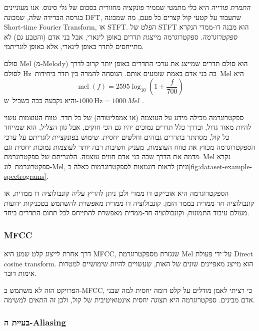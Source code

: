 \documentclass[hebrew, a4paper]{article}
\theoremstyle{plain}
\theoremstyle{definition}
\numberwithin{equation}{section}
\begin{document}
\emph{התמרת פורייה} היא כלי מתמטי שממיר פונקציה מחזורית בסכום של גלי
סינוס. אנו מעוניינים בגרסה הבדידה שלה, שמכונה DFT, שתעבוד על קטעי קול
קצרים כל פעם, מה שמכונה Short-time Fourier Transform, או STFT. הפלט של
STFT הוא מבנה דו-ממדי הנקרא \emph{ספקטרוגרמה}. ספקטרוגרמה מייצגת תדרים
באופן לינארי, אבל בני אדם (והטבע גם) לא מתייחסים לתדר באופן לינארי,
אלא באופן לוגריתמי.

סולם Mel (מ-Melody) הוא סולם תדרים שמייצג את ערכי התדרים באופן יותר
קרוב לדרך בה בני אדם באמת שומעים אותם. הנוסחה להמרה בין תדר
ביחידות~$\unit{\Hz}$ לסולם~Mel היא
\begin{equation}
  \label{eq:mel-scale}
  \operatorname{mel}(f) = \num{2595} \log_{10}\left(1 + \frac{f}{700}\right)
\end{equation}
והיא נקבעה ככה בשביל~ש-$\SI{1000}{\Hz} = \SI{1000}{Mel}$ .

ספקטרוגרמה מכילה מידע על העוצמה (או אמפליטודה) של כל תדר. טווח העוצמות
עשוי להיות מאוד גדול, ובדרך כלל תדרים נמוכים יהיו גם הכי חזקים, אבל
גוון הצליל, הוא שמייחד כל קול, מסתתר בתדרים גבוהים וחלשים יחסית. שימוש
בפונקציית לוגריתם על ערכי הספקטרוגרמה מכווץ את טווח העוצמות, מעניק
חשיבות רבה יותר לעוצמות נמוכות יחסית וגם מדמה את הדרך שבה בני אדם
חווים עוצמה. הלוגריתם של ספקטרוגרמת~Mel נקרא ספקטרוגרמת~לוג-Mel, וניתן
לראות דוגמאות לספקטרוגרמות כאלה
ב\autoref{fig:dataset-example-spectrograms}.

הספקטרוגרמה היא אובייקט דו-ממדי ולכן ניתן להריץ עליה קונבולוציה
דו-ממדית, או קונבולוציה חד-ממדית בממד הזמן. קונבולוציה דו-ממדית מאפשרת
להשתמש בטכניקות ידועות מעולם עיבוד התמונות, וקונבולוציה חד-ממדית
מאפשרת להתייחס לכל תחום התדרים ביחד.

\subsubsection{MFCC}
\label{sec:mfcc}

דרך אחרת לייצוג קלט שמע היא MFCC, שנגזרת מספקטרוגרמת Mel על־ידי פעולת
Direct cosine transform. הוא מייצג מאפיינים שונים של האות, שעשויים
להיות שימושיים למטרות אימות דובר.

הפרויקט הזה לא משתמש ב-MFCC, כי רציתי לאמן מודלים על קלט דומה יחסית
למה שבני אדם מבינים. ספקטרוגרמה היא תצוגה יחסית אינטואיטיבית של קול,
ולכן זה התאים למשימה.

\subsubsection{בעיית ה-Aliasing}
\label{sec:frequency-limits}
\end{document}
